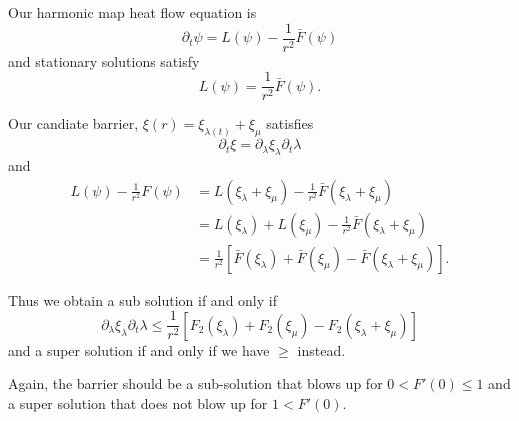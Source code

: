 \documentclass{amsart}
\begin{document}
Our harmonic map heat flow equation is
\[
\partial_t \psi = L(\psi) - \frac{1}{r^2} \bar{F}(\psi)
\]
and stationary solutions satisfy
\[
L(\psi) = \frac{1}{r^2} \bar{F}(\psi).
\]

Our candiate barrier, \(\xi(r) = \xi_{\lambda(t)} + \xi_{\mu}\) satisfies
\[
\partial_t \xi = \partial_{\lambda} \xi_{\lambda} \partial_t \lambda
\]
and
\[
\begin{split}
L(\psi) - \frac{1}{r^2} F(\psi) &= L(\xi_{\lambda} + \xi_{\mu}) - \frac{1}{r^2} \bar{F}(\xi_{\lambda} + \xi_{\mu}) \\
&= L(\xi_{\lambda}) + L(\xi_{\mu}) - \frac{1}{r^2} \bar{F}(\xi_{\lambda} + \xi_{\mu}) \\
&= \frac{1}{r^2}\left[\bar{F}(\xi_{\lambda}) + \bar{F}(\xi_{\mu}) - \bar{F}(\xi_{\lambda} + \xi_{\mu})\right].
\end{split}
\]

Thus we obtain a sub solution if and only if
\[
\partial_{\lambda} \xi_{\lambda} \partial_t \lambda \leq \frac{1}{r^2}\left[F_2(\xi_{\lambda}) + F_2(\xi_{\mu}) - F_2(\xi_{\lambda} + \xi_{\mu})\right]
\]
and a super solution if and only if we have \(\geq\) instead.

{\color{red}Again, the barrier should be a sub-solution that blows up for \(0 < F'(0) \leq 1\)  and a super solution that does not blow up for \(1 < F'(0)\).}
\end{document}
